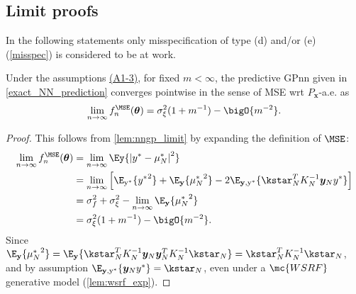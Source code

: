 \subsection{Limit proofs}
\label{sec:limit_proofs}
In the following statements only misspecification of type (d) and/or (e) (\autoref{misspec}) is considered to be at work.


\begin{lemma}
    \label{lem:mse_limit}
    Under the assumptions \hyperref[{desc:assumptions_nngp}]{(A1-3)}, for fixed \(m<\infty\), the predictive GPnn given in \autoref{exact_NN_prediction} converges pointwise in the sense of MSE wrt \(P_\mathbf{x}\)-a.e. as
    \[\lim_{n\rightarrow\infty}f_n^{\MSE}(\bm{\theta}) = \sigma_\xi^2(1+m^{-1}) - \bigO{m^{-2}}.\]
\end{lemma}
\begin{proof}\label{proof:mse_limit}
    This follows from \autoref{lem:nngp_limit} by expanding the definition
    of \(\MSE\):
    \begin{align*}
        \lim_{n\rightarrow\infty}f_n^{\MSE}(\bm{\theta})
        &=\lim_{n\rightarrow\infty}\Ey{\abs{y^* - \mu_N^*}^2} \\
        &= \lim_{n\rightarrow\infty}\left[\E_\mathrm{y^*}\{{y^*}^2\} + \E_\mathbf{y}\{{\mu^*_N}^2\} - 2\E_{\mathbf{y},\mathrm{y^*}}\{\kstar_N^TK_N^{-1}\bm{y}_Ny^*\}\right]\\
        &= \sigma_f^2 + \sigma_\xi^2 -
        \lim_{n\rightarrow\infty}\E_\mathbf{y}\{{\mu^*_N}^2\} \\
        &= \sigma_\xi^2(1 +m^{-1}) - \bigO{m^{-2}}.
    \end{align*}
    Since \(\E_\mathbf{y}\{{\mu^*_N}^2\}=\E_\mathbf{y}\{\kstar_N^TK_N^{-1}\bm{y}_N\bm{y}_N^TK_N^{-1}\kstar_N\}=\kstar_N^TK_N^{-1}\kstar_N\), and by assumption \(\E_{\mathbf{y},\mathrm{y^*}}\{\bm{y}_Ny^*\}=\kstar_N\), even under a \(\mc{WSRF}\) generative model (\autoref{lem:wsrf_exp}).
\end{proof}

